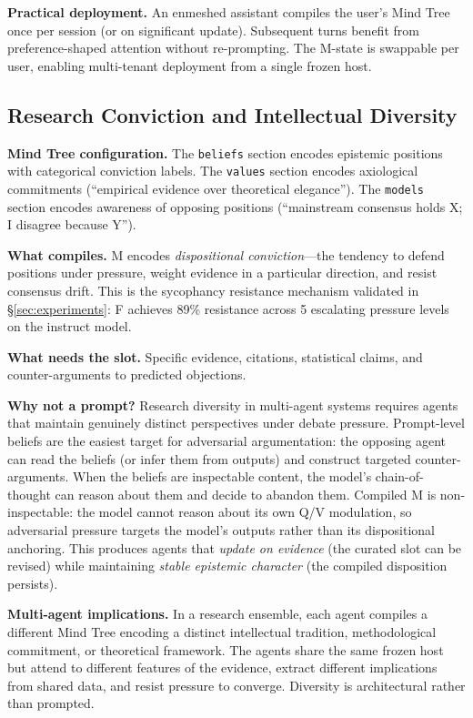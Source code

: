 \textbf{Practical deployment.} An enmeshed assistant compiles the user's Mind Tree once per session (or on significant update). Subsequent turns benefit from preference-shaped attention without re-prompting. The M-state is swappable per user, enabling multi-tenant deployment from a single frozen host.

\subsection{Research Conviction and Intellectual Diversity}

\textbf{Mind Tree configuration.} The \texttt{beliefs} section encodes epistemic positions with categorical conviction labels. The \texttt{values} section encodes axiological commitments (``empirical evidence over theoretical elegance''). The \texttt{models} section encodes awareness of opposing positions (``mainstream consensus holds X; I disagree because Y'').

\textbf{What compiles.} M encodes \emph{dispositional conviction}---the tendency to defend positions under pressure, weight evidence in a particular direction, and resist consensus drift. This is the sycophancy resistance mechanism validated in \S\ref{sec:experiments}: F achieves 89\% resistance across 5 escalating pressure levels on the instruct model.

\textbf{What needs the slot.} Specific evidence, citations, statistical claims, and counter-arguments to predicted objections.

\textbf{Why not a prompt?} Research diversity in multi-agent systems requires agents that maintain genuinely distinct perspectives under debate pressure. Prompt-level beliefs are the easiest target for adversarial argumentation: the opposing agent can read the beliefs (or infer them from outputs) and construct targeted counter-arguments. When the beliefs are inspectable content, the model's chain-of-thought can reason about them and decide to abandon them. Compiled M is non-inspectable: the model cannot reason about its own Q/V modulation, so adversarial pressure targets the model's outputs rather than its dispositional anchoring. This produces agents that \emph{update on evidence} (the curated slot can be revised) while maintaining \emph{stable epistemic character} (the compiled disposition persists).

\textbf{Multi-agent implications.} In a research ensemble, each agent compiles a different Mind Tree encoding a distinct intellectual tradition, methodological commitment, or theoretical framework. The agents share the same frozen host but attend to different features of the evidence, extract different implications from shared data, and resist pressure to converge. Diversity is architectural rather than prompted.

